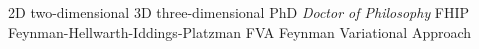                      {2D}    {two-dimensional}
                     {3D}    {three-dimensional}
   {PhD}   {\emph{Doctor of Philosophy}}
  {FHIP}  {Feynman-Hellwarth-Iddings-Platzman}
  {FVA}  {Feynman Variational Approach}
